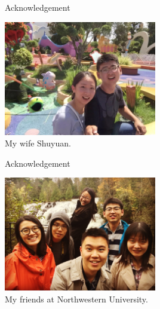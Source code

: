 \begin{frame}{Acknowledgement}
    \begin{center}
        \includegraphics[width=0.5\textwidth]{slides/figures/shuyuan.JPG} \\
        My wife Shuyuan.
    \end{center}
\end{frame}


\begin{frame}{Acknowledgement}       
    \begin{center}
        \includegraphics[width=0.5\textwidth]{slides/figures/friends}\\
        My friends at Northwestern University.
    \end{center}
\end{frame}


